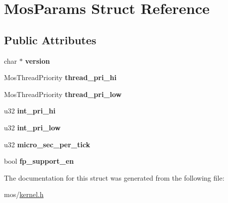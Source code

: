 \hypertarget{structMosParams}{}\section{Mos\+Params Struct Reference}
\label{structMosParams}
\subsection*{Public Attributes}
\begin{DoxyCompactItemize}
\item 
\mbox{\label{structMosParams_ae87ec56d27ce859148ad301afeea3390}} 
char $\ast$ {\bfseries version}
\item 
\mbox{\label{structMosParams_a23d3ae62ad483de21b10bfbe8cbf9bab}} 
Mos\+Thread\+Priority {\bfseries thread\+\_\+pri\+\_\+hi}
\item 
\mbox{\label{structMosParams_a597614a4ad790e727c49b62acef610b9}} 
Mos\+Thread\+Priority {\bfseries thread\+\_\+pri\+\_\+low}
\item 
\mbox{\label{structMosParams_a41c13442ae606fe1c90cefb95b63f49c}} 
u32 {\bfseries int\+\_\+pri\+\_\+hi}
\item 
\mbox{\label{structMosParams_af883999419b2bf5ecb3aeeb9e4506f3a}} 
u32 {\bfseries int\+\_\+pri\+\_\+low}
\item 
\mbox{\label{structMosParams_a5a19cef0b7f76b3ab11034341bdc6f25}} 
u32 {\bfseries micro\+\_\+sec\+\_\+per\+\_\+tick}
\item 
\mbox{\label{structMosParams_adcbc515ff9d63a33b61181168a7b52b2}} 
bool {\bfseries fp\+\_\+support\+\_\+en}
\end{DoxyCompactItemize}


The documentation for this struct was generated from the following file\+:\begin{DoxyCompactItemize}
\item 
mos/\hyperlink{kernel_8h}{kernel.\+h}\end{DoxyCompactItemize}
